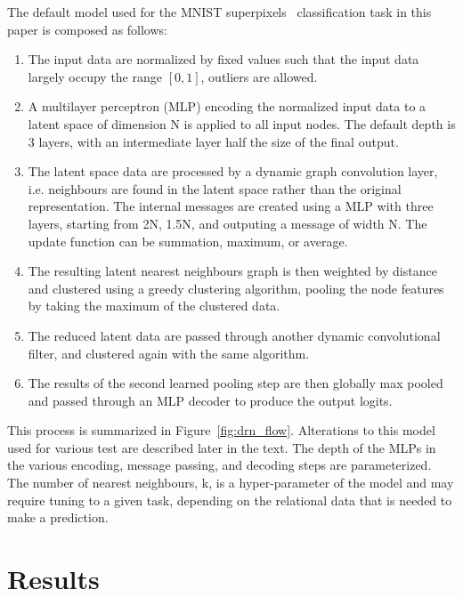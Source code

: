 \documentclass{article}
\begin{document}
The default model used for the MNIST superpixels~\cite{monti2016geometric} classification task in this paper is composed as follows:
\begin{enumerate}
    \item The input data are normalized by fixed values such that the input data largely occupy the range $[0,1]$, outliers are allowed.
    \item A multilayer perceptron (MLP) encoding the normalized input data to a latent space of dimension N is applied to all input nodes. The default depth is 3 layers, with an intermediate layer half the size of the final output.
    \item The latent space data are processed by a dynamic graph convolution layer, i.e. neighbours are found in the latent space rather than the original representation. The internal messages are created using a MLP with three layers, starting from 2N, 1.5N, and outputing a message of width N. The update function can be summation, maximum, or average.
    \item The resulting latent nearest neighbours graph is then weighted by distance and clustered using a greedy clustering algorithm, pooling the node features by taking the maximum of the clustered data.
    \item The reduced latent data are passed through another dynamic convolutional filter, and clustered again with the same algorithm.
    \item The results of the second learned pooling step are then globally max pooled and passed through an MLP decoder to produce the output logits.
\end{enumerate}
\noindent
This process is summarized in Figure~\ref{fig:drn_flow}.
Alterations to this model used for various test are described later in the text.
The depth of the MLPs in the various encoding, message passing, and decoding steps are parameterized.
The number of nearest neighbours, k, is a hyper-parameter of the model and may require tuning to a given task, depending on the relational data that is needed to make a prediction.

\section{Results}
\end{document}

